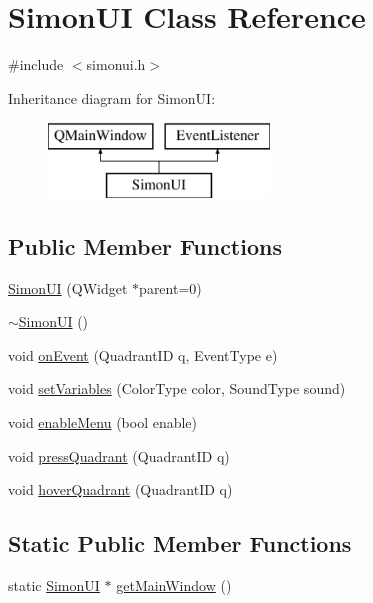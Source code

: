 \hypertarget{class_simon_u_i}{\section{Simon\+U\+I Class Reference}
\label{class_simon_u_i}
}


{\ttfamily \#include $<$simonui.\+h$>$}

Inheritance diagram for Simon\+U\+I\+:\begin{figure}[H]
\begin{center}
\leavevmode
\includegraphics[height=2.000000cm]{class_simon_u_i}
\end{center}
\end{figure}
\subsection*{Public Member Functions}
\begin{DoxyCompactItemize}
\item 
\hyperlink{class_simon_u_i_aa39db09f5a4cdeb3083de44da983690e}{Simon\+U\+I} (Q\+Widget $\ast$parent=0)
\item 
\hyperlink{class_simon_u_i_a1158d78365109c8bb21563df5bcc7239}{$\sim$\+Simon\+U\+I} ()
\item 
void \hyperlink{class_simon_u_i_a9a8de04376322efe03495a873d8e08d9}{on\+Event} (Quadrant\+I\+D q, Event\+Type e)
\item 
void \hyperlink{class_simon_u_i_ad5e1e4ea6e411396afb181e29b3f2a25}{set\+Variables} (Color\+Type color, Sound\+Type sound)
\item 
void \hyperlink{class_simon_u_i_afc9c076401c1407d5a82751fadfd77ce}{enable\+Menu} (bool enable)
\item 
void \hyperlink{class_simon_u_i_a408401c0f50f6c65c14af8742b74e571}{press\+Quadrant} (Quadrant\+I\+D q)
\item 
void \hyperlink{class_simon_u_i_ab3e596178a1ef6f35313b9f67df8d301}{hover\+Quadrant} (Quadrant\+I\+D q)
\end{DoxyCompactItemize}
\subsection*{Static Public Member Functions}
\begin{DoxyCompactItemize}
\item 
static \hyperlink{class_simon_u_i}{Simon\+U\+I} $\ast$ \hyperlink{class_simon_u_i_af2a6bcb286d56a2ef463c46884f58b8c}{get\+Main\+Window} ()
\end{DoxyCompactItemize}


